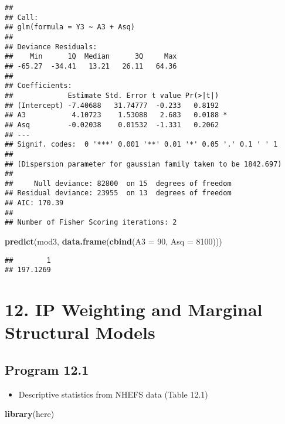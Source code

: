 \documentclass[10pt,]{book}
\newenvironment{Shaded}{\begin{snugshade}}{\end{snugshade}}
\newcommand{\DataTypeTok}[1]{\textcolor[rgb]{0.13,0.29,0.53}{#1}}
\newcommand{\DecValTok}[1]{\textcolor[rgb]{0.00,0.00,0.81}{#1}}
\newcommand{\KeywordTok}[1]{\textcolor[rgb]{0.13,0.29,0.53}{\textbf{#1}}}
\newcommand{\NormalTok}[1]{#1}
\providecommand{\tightlist}{%
  \setlength{\itemsep}{0pt}\setlength{\parskip}{0pt}}
\begin{document}
\begin{verbatim}
## 
## Call:
## glm(formula = Y3 ~ A3 + Asq)
## 
## Deviance Residuals: 
##    Min      1Q  Median      3Q     Max  
## -65.27  -34.41   13.21   26.11   64.36  
## 
## Coefficients:
##             Estimate Std. Error t value Pr(>|t|)  
## (Intercept) -7.40688   31.74777  -0.233   0.8192  
## A3           4.10723    1.53088   2.683   0.0188 *
## Asq         -0.02038    0.01532  -1.331   0.2062  
## ---
## Signif. codes:  0 '***' 0.001 '**' 0.01 '*' 0.05 '.' 0.1 ' ' 1
## 
## (Dispersion parameter for gaussian family taken to be 1842.697)
## 
##     Null deviance: 82800  on 15  degrees of freedom
## Residual deviance: 23955  on 13  degrees of freedom
## AIC: 170.39
## 
## Number of Fisher Scoring iterations: 2
\end{verbatim}

\begin{Shaded}
\begin{Highlighting}[]
\KeywordTok{predict}\NormalTok{(mod3, }\KeywordTok{data.frame}\NormalTok{(}\KeywordTok{cbind}\NormalTok{(}\DataTypeTok{A3 =} \DecValTok{90}\NormalTok{, }\DataTypeTok{Asq =} \DecValTok{8100}\NormalTok{)))}
\end{Highlighting}
\end{Shaded}

\begin{verbatim}
##        1 
## 197.1269
\end{verbatim}

\hypertarget{ip-weighting-and-marginal-structural-models}{%
\chapter*{12. IP Weighting and Marginal Structural Models}\label{ip-weighting-and-marginal-structural-models}}

\hypertarget{program-12.1}{%
\section{Program 12.1}\label{program-12.1}}

\begin{itemize}
\tightlist
\item
  Descriptive statistics from NHEFS data (Table 12.1)
\end{itemize}

\begin{Shaded}
\begin{Highlighting}[]
\KeywordTok{library}\NormalTok{(here)}
\end{Highlighting}
\end{Shaded}
\end{document}
